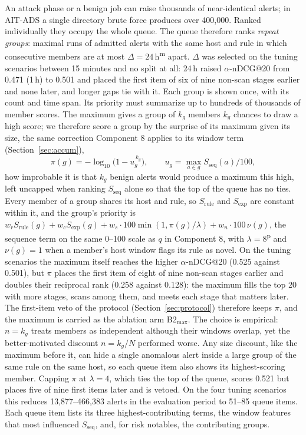 \documentclass[conference]{IEEEtran}
\newcommand{\prov}{\textsuperscript{\textcolor{orange!80!black}{p}}}   %
\newcommand{\meas}{\textsuperscript{\textcolor{green!45!black}{m}}}    %
\begin{document}
An attack phase or a benign job can raise thousands of near-identical alerts; in AIT-ADS a single directory brute force produces over 400{,}000. Ranked individually they occupy the whole queue. The queue therefore ranks \emph{repeat groups}: maximal runs of admitted alerts with the same host and rule in which consecutive members are at most $\Delta = 24$\,h\meas{} apart. $\Delta$ was selected on the tuning scenarios between 15 minutes and no split at all: 24\,h raised $\alpha$-nDCG@20 from 0.471 (1\,h) to 0.501 and placed the first item of six of nine non-scan stages earlier and none later, and longer gaps tie with it. Each group is shown once, with its count and time span. Its priority must summarize up to hundreds of thousands of member scores. The maximum gives a group of $k_g$ members $k_g$ chances to draw a high score; we therefore score a group by the surprise of its maximum given its size, the same correction Component 8 applies to its window term (Section~\ref{sec:accum}),
\begin{equation}
\pi(g) = -\log_{10}\!\big(1 - u_g^{\,k_g}\big), \qquad u_g = \max_{a \in g} S_\mathrm{seq}(a)/100,
\end{equation}
how improbable it is that $k_g$ benign alerts would produce a maximum this high, left uncapped when ranking $S_\mathrm{seq}$ alone so that the top of the queue has no ties. Every member of a group shares its host and rule, so $S_\mathrm{rule}$ and $S_\mathrm{exp}$ are constant within it, and the group's priority is $w_r S_\mathrm{rule}(g) + w_c S_\mathrm{exp}(g) + w_s \cdot 100 \min(1, \pi(g)/\lambda) + w_n \cdot 100\,\nu(g)$, the sequence term on the same 0--100 scale as $q$ in Component 8, with $\lambda = 8$\prov{} and $\nu(g) = 1$ when a member's host window flags its rule as novel. On the tuning scenarios the maximum itself reaches the higher $\alpha$-nDCG@20 (0.525 against 0.501), but $\pi$ places the first item of eight of nine non-scan stages earlier and doubles their reciprocal rank (0.258 against 0.128): the maximum fills the top 20 with more stages, scans among them, and meets each stage that matters later. The first-item veto of the protocol (Section~\ref{sec:protocol}) therefore keeps $\pi$, and the maximum is carried as the ablation arm B2$_\mathrm{max}$. The choice is empirical: $n = k_g$ treats members as independent although their windows overlap, yet the better-motivated discount $n = k_g/N$ performed worse. Any size discount, like the maximum before it, can hide a single anomalous alert inside a large group of the same rule on the same host, so each queue item also shows its highest-scoring member. Capping $\pi$ at $\lambda = 4$, which ties the top of the queue, scores 0.521 but places five of nine first items later and is vetoed. On the four tuning scenarios this reduces 13{,}877--466{,}383 alerts in the evaluation period to 51--85 queue items. Each queue item lists its three highest-contributing terms, the window features that most influenced $S_\mathrm{seq}$, and, for risk notables, the contributing groups.
\end{document}
